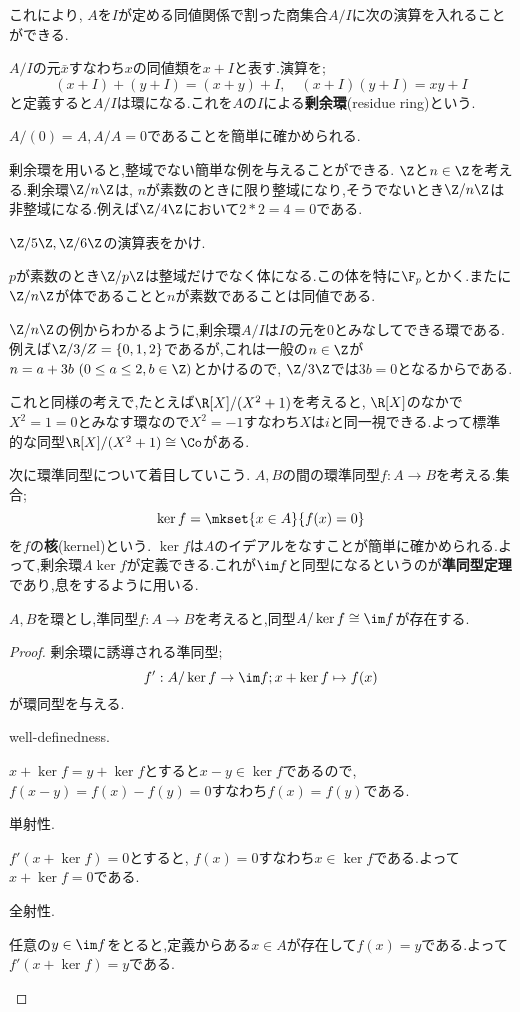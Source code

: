 これにより, $A$を$I$が定める同値関係で割った商集合$A/I$に次の演算を入れることができる.

\begin{defi}[剰余環]
	$A/I$の元$\bar{x}$すなわち$x$の同値類を$x+I$と表す.演算を;
	\[(x+I)+(y+I)=(x+y)+I,\quad (x+I)(y+I)=xy+I\]
	と定義すると$A/I$は環になる.これを$A$の$I$による\textbf{剰余環}(residue ring)という.
\end{defi}

$A/(0)=A, A/A=0$であることを簡単に確かめられる.

剰余環を用いると,整域でない簡単な例を与えることができる. $\Z$と$n\in\Z$を考える.剰余環$\Z/n\Z$は, $n$が素数のときに限り整域になり,そうでないとき$\Z/n\Z$は非整域になる.例えば$\Z/4\Z$において$2*2=4=0$である.

\begin{exer}
	$\Z/5\Z,\Z/6\Z$の演算表をかけ.
\end{exer}

$p$が素数のとき$\Z/p\Z$は整域だけでなく体になる.この体を特に$\F_p$とかく.またに$\Z/n\Z$が体であることと$n$が素数であることは同値である.

$\Z/n\Z$の例からわかるように,剰余環$A/I$は$I$の元を0とみなしてできる環である.例えば$\Z/3/Z=\{0,1,2\}$であるが,これは一般の$n\in\Z$が$n=a+3b~(0\leq a\leq 2,b\in\Z)$とかけるので, $\Z/3\Z$では$3b=0$となるからである.

これと同様の考えで,たとえば$\R[X]/(X^2+1)$を考えると, $\R[X]$のなかで$X^2=1=0$とみなす環なので$X^2=-1$すなわち$X$は$i$と同一視できる.よって標準的な同型$\R[X]/(X^2+1)\cong\Co$がある.

次に環準同型について着目していこう. $A,B$の間の環準同型$f:A\to B$を考える.集合;
\[\ker f=\mkset{x\in A}{f(x)=0}\]
を$f$の\textbf{核}(kernel)という. $\ker f$は$A$のイデアルをなすことが簡単に確かめられる.よって,剰余環$A\ker f$が定義できる.これが$\im f$と同型になるというのが\textbf{準同型定理}であり,息をするように用いる.

\begin{thm}[準同型定理]
	$A,B$を環とし,準同型$f:A\to B$を考えると,同型$A/\ker f\cong\im f$が存在する.
\end{thm}

\begin{proof}
	剰余環に誘導される準同型;
	\[f':A/\ker f\to\im f;x+\ker f\mapsto f(x)\]
	が環同型を与える.
	\begin{step}
		\item well-definedness.
		
		$x+\ker f=y+\ker f$とすると$x-y\in\ker f$であるので, $f(x-y)=f(x)-f(y)=0$すなわち$f(x)=f(y)$である.
		
		\item 単射性.
		
		$f'(x+\ker f)=0$とすると, $f(x)=0$すなわち$x\in\ker f$である.よって$x+\ker f=0$である.
		
		\item 全射性.
		
		任意の$y\in \im f$をとると,定義からある$x\in A$が存在して$f(x)=y$である.よって$f'(x+\ker f)=y$である.
	\end{step}
\end{proof}

